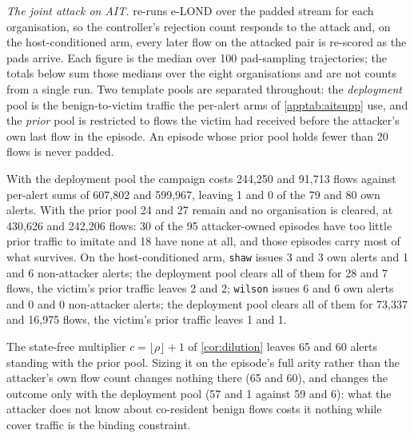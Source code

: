 \emph{The joint attack on AIT.}  re-runs e-LOND over the padded stream for
each organisation, so the controller's rejection count responds to the attack and, on the
host-conditioned arm, every later flow on the attacked pair is re-scored as the pads arrive. Each figure
is the median over 100 pad-sampling trajectories; the totals below sum those medians over the eight
organisations and are not counts from a single run. Two template pools are separated throughout: the
\emph{deployment} pool is the benign-to-victim traffic the per-alert arms of \cref{apptab:aitsupp} use,
and the \emph{prior} pool is restricted to flows the victim had received before the attacker's own last
flow in the episode. An episode whose prior pool holds fewer than 20 flows is never padded.

With the deployment pool the campaign costs 244{,}250 and 91{,}713 flows against per-alert sums of
607{,}802 and 599{,}967, leaving 1 and 0 of the 79 and 80 own alerts. With the prior pool
24 and 27 remain and no organisation is cleared, at 430{,}626 and 242{,}206 flows: 30 of the
95 attacker-owned episodes have too little prior traffic to imitate and 18 have none at all, and those
episodes carry most of what survives. On the host-conditioned arm, \texttt{shaw} issues 3 and 3 own alerts and 1 and 6 non-attacker alerts; the deployment pool clears all of them for 28 and 7 flows, the victim's prior traffic leaves 2 and 2; \texttt{wilson} issues 6 and 6 own alerts and 0 and 0 non-attacker alerts; the deployment pool clears all of them for 73{,}337 and 16{,}975 flows, the victim's prior traffic leaves 1 and 1.

The state-free multiplier $c=\lfloor\rho\rfloor+1$ of \cref{cor:dilution} leaves 65 and 60 alerts standing
with the prior pool. Sizing it on the episode's full arity rather than the attacker's own flow count
changes nothing there (65 and 60), and changes the outcome only with the deployment pool
(57 and 1 against 59 and 6): what the attacker does not know about co-resident benign
flows costs it nothing while cover traffic is the binding constraint.
